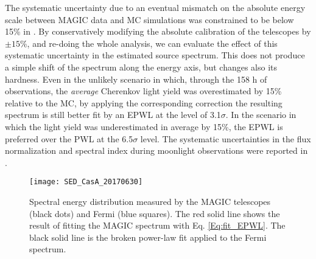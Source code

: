 \documentclass{PoS}
\newcommand{\Revision}[1]{\textbf{#1}}
\begin{document}
The systematic uncertainty due to an eventual mismatch on the absolute energy scale between MAGIC data and MC simulations was constrained to be below 15\% in \cite{Magic_performanceII}. By conservatively modifying the absolute calibration of the telescopes by $\pm 15\%$, and re-doing the whole analysis, we can evaluate the effect of this systematic uncertainty in the estimated source spectrum. This does not produce a simple shift of the spectrum along the energy axis, but changes also its hardness. Even in the unlikely scenario in which, through the 158 h of observations, the {\it average} Cherenkov light yield was overestimated by 15\% relative to the MC, by applying the corresponding correction the resulting spectrum is still better fit by an EPWL at the level of 3.1$\sigma$. In the scenario in which the light yield was underestimated in average by 15\%, the EPWL is preferred over the PWL at the 6.5$\sigma$ level.
The systematic uncertainties in the flux normalization and spectral index during moonlight observations were reported in \cite{MAGIC_moon}. 




\begin{figure}[t]
\centering
\texttt{[image: SED\_CasA\_20170630]}
\caption{Spectral energy distribution measured by the MAGIC telescopes (black dots) and Fermi (blue squares). The red solid line shows the result of fitting the MAGIC spectrum with Eq. \ref{Eq:fit_EPWL}. The black solid line is the broken power-law fit applied to the Fermi spectrum.}\label{fig:SED}
\end{figure}

\end{document}
